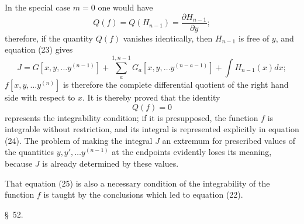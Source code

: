 \documentclass[11pt,a4paper,leqno]{article}
\begin{document}
In the special case $m=0$ one would have
\[
Q(f)=Q(H_{n-1})=\frac{\partial H_{n-1}}{\partial y};
\]
therefore, if the quantity $Q(f)$ vanishes identically, then $H_{n-1}$ is free of $y$, and equation (23) gives
\begin{equation}\tag{24}
J=G[x,y,\ldots y^{(n-1)}]+\sum_a^{1,n-1}G_a[x,y,\ldots y^{(n-a-1)}]
+\int H_{n-1}(x)dx;
\end{equation}
$f[x,y,\ldots y^{(n)}]$ is therefore the complete differential quotient of the right hand side with respect to $x$. It is thereby proved that the identity
\begin{equation}\tag{25}
Q(f)=0
\end{equation}
represents the integrability condition; if it is presupposed, the function $f$ is integrable without restriction, and its integral is represented explicitly in equation (24). The problem of making the integral $J$ an extremum for prescribed values of the quantities $y,y',\ldots y^{(n-1)}$ at the endpoints evidently loses its meaning, because $J$ is already determined by these values.

That equation (25) is also a necessary condition of the integrability of the function $f$ is taught by the conclusions which led to equation (22).

\begin{center}
{\large \S~52.}
\end{center}
\end{document}
